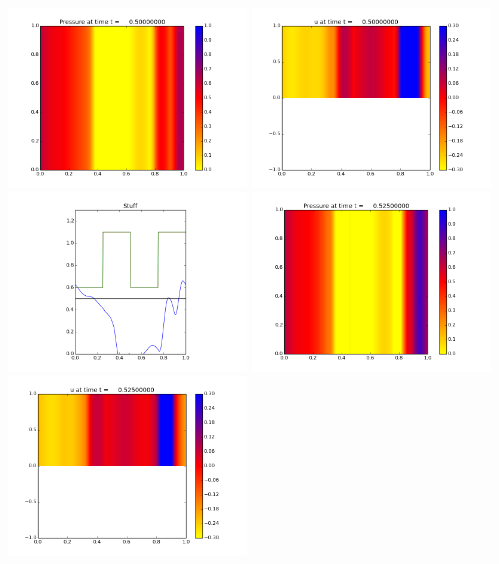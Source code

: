\documentclass[11pt]{article}
\begin{document}
\vskip 10pt 
\includegraphics[width=0.475\textwidth]{frame0020fig0.png}
\includegraphics[width=0.475\textwidth]{frame0020fig1.png}
\vskip 10pt 
\includegraphics[width=0.475\textwidth]{frame0020fig3.png}
\vskip 10pt 
\includegraphics[width=0.475\textwidth]{frame0021fig0.png}
\includegraphics[width=0.475\textwidth]{frame0021fig1.png}
\end{document}
